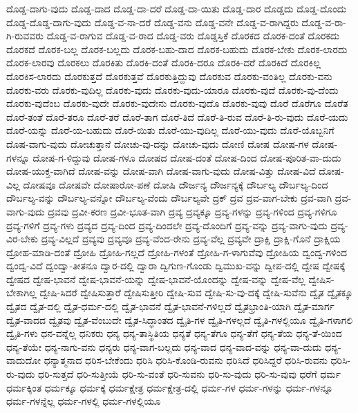 {ದೊಡ್ಡ-ದಾಗು-ವುದು
ದೊಡ್ಡ-ದಾದ
ದೊಡ್ಡ-ದಾ-ದರೆ
ದೊಡ್ಡ-ದಾ-ಯಿತು
ದೊಡ್ಡ-ದಾರ
ದೊಡ್ಡದು
ದೊಡ್ಡ-ದೊಂದು
ದೊಡ್ಡ-ದೊಡ್ಡ-ದಾಗು-ವುದು
ದೊಡ್ಡ-ವ-ನಾ-ದರೆ
ದೊಡ್ಡ-ವನು
ದೊಡ್ಡ-ವನೇ
ದೊಡ್ಡ-ವ-ರಾಗಿದ್ದರು
ದೊಡ್ಡ-ವ-ರಾ-ಗಿ-ರುವವರು
ದೊಡ್ಡ-ವ-ರಾಗುವ
ದೊಡ್ಡ-ವ-ರಾದ
ದೊಡ್ಡ-ವರು
ದೊಡ್ಡಸ್ತಿಕೆ
ದೊರಕದ
ದೊರಕ-ದಂತೆ
ದೊರಕದು
ದೊರಕದೆ
ದೊರಕ-ಬಲ್ಲ
ದೊರಕ-ಬಲ್ಲದು
ದೊರಕ-ಬಹು-ದಾದ
ದೊರಕ-ಬಹುದು
ದೊರಕ-ಬೇಕು
ದೊರಕ-ಲಾರದು
ದೊರಕ-ಲಾರವು
ದೊರಕಲು
ದೊರಕಿತು
ದೊರಕಿ-ದಂತೆ
ದೊರಕಿ-ದರೂ
ದೊರಕಿ-ದರೆ
ದೊರಕಿದೆ
ದೊರಕಿಲ್ಲ
ದೊರಕಿಸ-ಲಾರದು
ದೊರಕುತ್ತದೆ
ದೊರಕುತ್ತವೆ
ದೊರಕುತ್ತಿದ್ದುವು
ದೊರಕುವ
ದೊರಕು-ವಂತಿಲ್ಲ
ದೊರಕು-ವನು
ದೊರಕು-ವರು
ದೊರಕು-ವುದಿಲ್ಲ
ದೊರಕು-ವುದು
ದೊರಕು-ವುದು-ಯಾರೂ
ದೊರಕು-ವುದೆ
ದೊರಕು-ವು-ದೆಂದು
ದೊರಕು-ವುದೆಂಬ
ದೊರಕು-ವುದೇ
ದೊರಕು-ವುದೇನು
ದೊರಕು-ವುದೊ
ದೊರಕು-ವುವು
ದೊರೆ
ದೊರೆಗೂ
ದೊರೆತ
ದೊರೆ-ತಂತೆ
ದೊರೆ-ತರೂ
ದೊರೆ-ತರೆ
ದೊರೆ-ತಾಗ
ದೊರೆ-ತಿದೆ
ದೊರೆ-ತಿ-ರುವ
ದೊರೆ-ತಿ-ರು-ವುದು
ದೊರೆ-ಯದು
ದೊರೆ-ಯನ್ನು
ದೊರೆ-ಯ-ಬಹುದು
ದೊರೆ-ಯಿತು
ದೊರೆ-ಯು-ವುದಿಲ್ಲ
ದೊರೆ-ಯು-ವುದು
ದೊರೆ-ಯೊಬ್ಬನಿಗೆ
ದೊಷ-ವಾಗು-ವುದು
ದೋಚುತ್ತಾನೆ
ದೋಚು-ವು-ದನ್ನು
ದೋಚು-ವುದು
ದೋಣಿ
ದೋಷ
ದೋಷ-ಗಳ
ದೋಷ-ಗಳನ್ನೂ
ದೋಷ-ಗ-ಳಿದ್ದುವು
ದೋಷ-ಗಳೂ
ದೋಷದ
ದೋಷ-ದಂತೆ
ದೋಷ-ದಿಂದ
ದೋಷ-ಪೂರಿತ-ವಾ-ದುದು
ದೋಷ-ಯುಕ್ತ-ವಾಗಿದೆ
ದೋಷ-ವನ್ನು
ದೋಷ-ವಾಗಿ
ದೋಷ-ವಾಗು-ವುದು
ದೋಷ-ವಿತ್ತು
ದೋಷ-ವಿದೆ
ದೋಷ-ವಿಲ್ಲ
ದೋಷವೂ
ದೋಷವೇ
ದೋಷಾರೋ-ಪಣೆ
ದೋಷಿ
ದೌರ್ಜನ್ಯ
ದೌರ್ಜನ್ಯಕ್ಕೆ
ದೌರ್ಬಲ್ಯ
ದೌರ್ಬಲ್ಯ-ದಿಂದ
ದೌರ್ಬಲ್ಯ-ವನ್ನು
ದೌರ್ಬಲ್ಯ-ವನ್ನೋ
ದೌರ್ಬಲ್ಯ-ವೆಂದು
ದೌರ್ಬಲ್ಯವೇ
ದ್ರಕ್
ದ್ರವ
ದ್ರವ-ವಾಗ-ಬೇಕು
ದ್ರವ-ವಾಗಿ
ದ್ರವ-ವಾಗು-ವುದು
ದ್ರವವು
ದ್ರವೀ-ಕರಣ
ದ್ರವೀ-ಭೂತ-ವಾಗಿ
ದ್ರವ್ಯ
ದ್ರವ್ಯಕ್ಕೂ
ದ್ರವ್ಯ-ಗಳನ್ನು
ದ್ರವ್ಯ-ಗಳಿಂದ
ದ್ರವ್ಯ-ಗಳಿಗೂ
ದ್ರವ್ಯ-ಗಳಿಗೆ
ದ್ರವ್ಯ-ಗಳು
ದ್ರವ್ಯದ
ದ್ರವ್ಯ-ದಿಂದ
ದ್ರವ್ಯ-ದಿಂದಲೇ
ದ್ರವ್ಯ-ದೊಂದಿಗೆ
ದ್ರವ್ಯ-ವನ್ನು
ದ್ರವ್ಯ-ವಾಗು-ವುದು
ದ್ರವ್ಯ-ವಿರ-ಬೇಕು
ದ್ರವ್ಯ-ವಿಲ್ಲದೆ
ದ್ರವ್ಯವು
ದ್ರವ್ಯವೂ
ದ್ರವ್ಯ-ವೆಂದ-ರೇನು
ದ್ರವ್ಯ-ವೆಲ್ಲ
ದ್ರವ್ಯವೇ
ದ್ರಾಕ್ಷಿ
ದ್ರಾಕ್ಷಿ-ಗೊನೆ
ದ್ರಾಕ್ಷಿಯ
ದ್ರೋಹ-ಮಾಡಿ-ದಂತೆ
ದ್ರೋಹಿ
ದ್ರೋಹಿ-ಗಲ್ಲದೆ
ದ್ರೋಹಿ-ಗಳಂತೆ
ದ್ರೋಹಿ-ಗ-ಳಾಗುವೆವು
ದ್ರೋಹಿಯ
ದ್ವಂದ್ವ-ಗಳಿಂದ
ದ್ವಂದ್ವ-ವಿದೆ
ದ್ವಂದ್ವಾ-ತೀತನೂ
ದ್ವಾರ-ದಲ್ಲಿ
ದ್ವಾರಾ
ದ್ವಿಗುಣ-ಗೊಂಡು
ದ್ವಿಮುಖ-ವನ್ನು
ದ್ವೀಪ-ದಲ್ಲಿ
ದ್ವೇಷ
ದ್ವೇಷಕ್ಕೆ
ದ್ವೇಷದ
ದ್ವೇಷ-ಭಾವನೆ
ದ್ವೇಷ-ಭಾವನೆ-ಯನ್ನು
ದ್ವೇಷ-ಭಾವನೆ-ಯೊಂದನ್ನು
ದ್ವೇಷ-ವನ್ನು
ದ್ವೇಷ-ವೆಲ್ಲ
ದ್ವೇಷಿಸ-ಬೇಕಾಗಿಲ್ಲ
ದ್ವೇಷಿ-ಸಿದರೆ
ದ್ವೇಷಿಸುತ್ತಾರೆ
ದ್ವೇಷಿಸುತ್ತೀರಿ
ದ್ವೇಷಿ-ಸುವ
ದ್ವೇಷಿ-ಸು-ವು-ದಕ್ಕೆ
ದ್ವೇಷಿ-ಸುವೆನು
ದ್ವೈತ
ದ್ವೈತಕ್ಕೂ
ದ್ವೈತದ
ದ್ವೈತ-ದಲ್ಲಿ
ದ್ವೈತ-ಧರ್ಮ-ದಲ್ಲಿ
ದ್ವೈತ-ಭಾವನೆ
ದ್ವೈತ-ಭಾವನೆ-ಗಳಿಲ್ಲದೆ
ದ್ವೈತಭ್ರಾಂತಿ-ಯಾಗಿ
ದ್ವೈತ-ಮಾರ್ಗ
ದ್ವೈತ-ವಾದದ
ದ್ವೈತವು
ದ್ವೈತ-ವೆಂಬುದೇ
ದ್ವೈತ-ಸಿದ್ಧಾಂತದ
ದ್ವೈತಿ-ಗಳ
ದ್ವೈತಿ-ಗಳಲ್ಲದೆ
ದ್ವೈತಿ-ಗಳಲ್ಲಿಯೂ
ದ್ವೈತಿ-ಗಳಾಗಲಿ
ದ್ವೈತಿ-ಗಳು
ಧನ-ವನ್ನೆಲ್ಲ
ಧನಿಕರು
ಧನ್ಯ
ಧನ್ಯ-ತಾಸ್ಥಿತಿಯ
ಧನ್ಯತೆ
ಧನ್ಯ-ತೆಗೂ
ಧನ್ಯ-ತೆಗೆ
ಧನ್ಯ-ತೆಯ
ಧನ್ಯ-ತೆ-ಯಿಂದ
ಧನ್ಯ-ತೆಯೇ
ಧನ್ಯ-ನಾಗು-ವನು
ಧನ್ಯರು
ಧನ್ಯ-ವಾಗ-ಬಲ್ಲದು
ಧನ್ಯ-ವಾದ
ಧನ್ಯ-ವಾದ-ವನ್ನು
ಧನ್ಯ-ವಾ-ದುದು
ಧನ್ಯ-ವಾದುದೋ
ಧನ್ಯಾತ್ಮನಾದ
ಧರಿಸ-ಬೇಕೆಂದು
ಧರಿಸಿ
ಧರಿಸಿ-ಕೊಂಡಿ-ರುವನು
ಧರಿಸಿದೆ
ಧರಿಸಿದ್ದರೆ
ಧರಿಸಿ-ರುವನು
ಧರಿಸಿ-ರು-ವುದು
ಧರಿ-ಸುತ್ತದೆ
ಧರಿ-ಸುತ್ತೀಯೆ
ಧರಿ-ಸು-ವಂತೆ
ಧರಿ-ಸುವನು
ಧರಿ-ಸು-ವುದು
ಧರಿ-ಸು-ವುವು
ಧರೆಗೆ
ಧರ್ಮ
ಧರ್ಮಕ್ಕಿಂತ
ಧರ್ಮಕ್ಕೂ
ಧರ್ಮಕ್ಕೆ
ಧರ್ಮಕ್ಷೇತ್ರ
ಧರ್ಮಕ್ಷೇತ್ರ-ದಲ್ಲಿ
ಧರ್ಮ-ಗಳ
ಧರ್ಮ-ಗಳನ್ನು
ಧರ್ಮ-ಗಳನ್ನೂ
ಧರ್ಮ-ಗಳನ್ನೆಲ್ಲ
ಧರ್ಮ-ಗಳಲ್ಲಿ
ಧರ್ಮ-ಗಳಲ್ಲಿಯೂ
}
